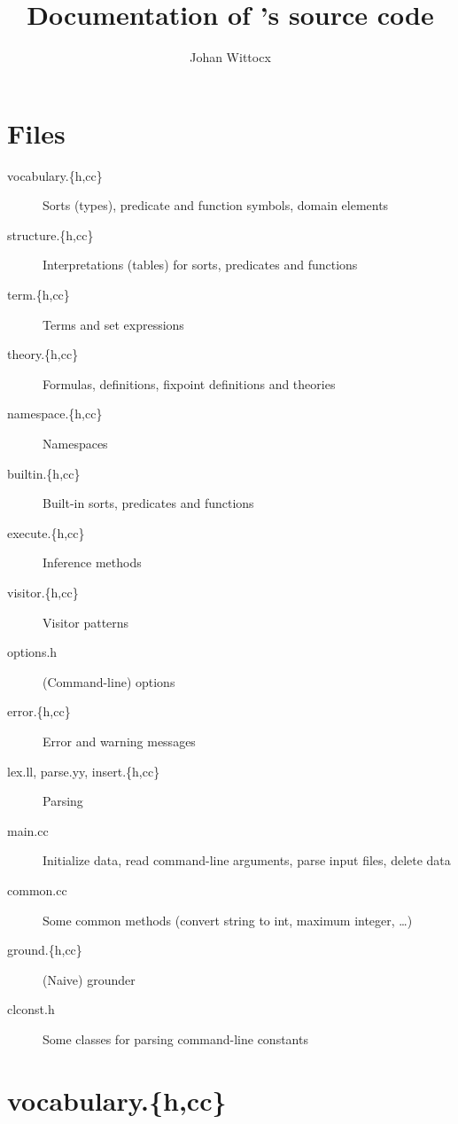 \documentclass{article}
\title{Documentation of \gidl's source code}
\author{Johan Wittocx}
\begin{document}
\maketitle

\section{Files}

\begin{description}
	\item[vocabulary.\{h,cc\}] Sorts (types), predicate and function symbols, domain elements
	\item[structure.\{h,cc\}] Interpretations (tables) for sorts, predicates and functions
	\item[term.\{h,cc\}] Terms and set expressions
	\item[theory.\{h,cc\}] Formulas, definitions, fixpoint definitions and theories
	\item[namespace.\{h,cc\}] Namespaces
	\item[builtin.\{h,cc\}] Built-in sorts, predicates and functions
	\item[execute.\{h,cc\}] Inference methods
	\item[visitor.\{h,cc\}] Visitor patterns
	\item[options.h] (Command-line) options
	\item[error.\{h,cc\}] Error and warning messages
	\item[lex.ll, parse.yy, insert.\{h,cc\}] Parsing
	\item[main.cc] Initialize data, read command-line arguments, parse input files, delete data
	\item[common.cc] Some common methods (convert string to int, maximum integer, \ldots)
	\item[ground.\{h,cc\}] (Naive) grounder
	\item[clconst.h] Some classes for parsing command-line constants
\end{description}

\section{vocabulary.\{h,cc\}}

\end{document}
